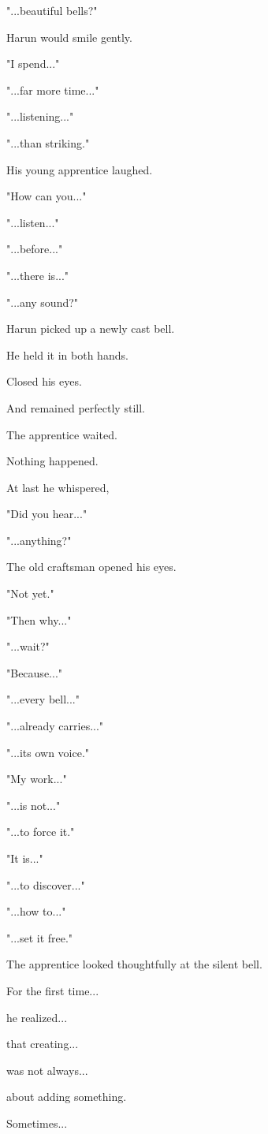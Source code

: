 \documentclass[12pt,openany]{book}
\begin{document}
"...beautiful bells?"

Harun would smile gently.

"I spend..."

"...far more time..."

"...listening..."

"...than striking."

His young apprentice laughed.

"How can you..."

"...listen..."

"...before..."

"...there is..."

"...any sound?"

Harun picked up a newly cast bell.

He held it in both hands.

Closed his eyes.

And remained perfectly still.

The apprentice waited.

Nothing happened.

At last he whispered,

"Did you hear..."

"...anything?"

The old craftsman opened his eyes.

"Not yet."

"Then why..."

"...wait?"

"Because..."

"...every bell..."

"...already carries..."

"...its own voice."

"My work..."

"...is not..."

"...to force it."

"It is..."

"...to discover..."

"...how to..."

"...set it free."

The apprentice looked thoughtfully at the silent bell.

For the first time...

he realized...

that creating...

was not always...

about adding something.

Sometimes...
\end{document}

